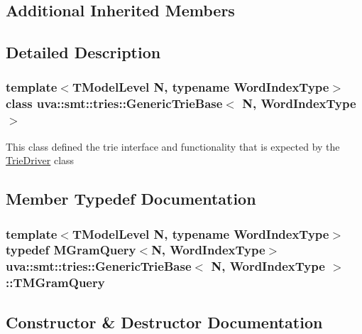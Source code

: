 \subsection*{Additional Inherited Members}


\subsection{Detailed Description}
\subsubsection*{template$<$T\+Model\+Level N, typename Word\+Index\+Type$>$class uva\+::smt\+::tries\+::\+Generic\+Trie\+Base$<$ N, Word\+Index\+Type $>$}

This class defined the trie interface and functionality that is expected by the \hyperlink{classuva_1_1smt_1_1tries_1_1_trie_driver}{Trie\+Driver} class 

\subsection{Member Typedef Documentation}
\hypertarget{classuva_1_1smt_1_1tries_1_1_generic_trie_base_a53a71f408bedf42ba24a566842bf3785}{}
\subsubsection[{T\+M\+Gram\+Query}]{\setlength{\rightskip}{0pt plus 5cm}template$<$T\+Model\+Level N, typename Word\+Index\+Type$>$ typedef {\bf M\+Gram\+Query}$<$N, {\bf Word\+Index\+Type}$>$ {\bf uva\+::smt\+::tries\+::\+Generic\+Trie\+Base}$<$ N, {\bf Word\+Index\+Type} $>$\+::{\bf T\+M\+Gram\+Query}}\label{classuva_1_1smt_1_1tries_1_1_generic_trie_base_a53a71f408bedf42ba24a566842bf3785}


\subsection{Constructor \& Destructor Documentation}
\hypertarget{classuva_1_1smt_1_1tries_1_1_generic_trie_base_a2eb30c9752298f2a21dfb784e555f42f}{}
